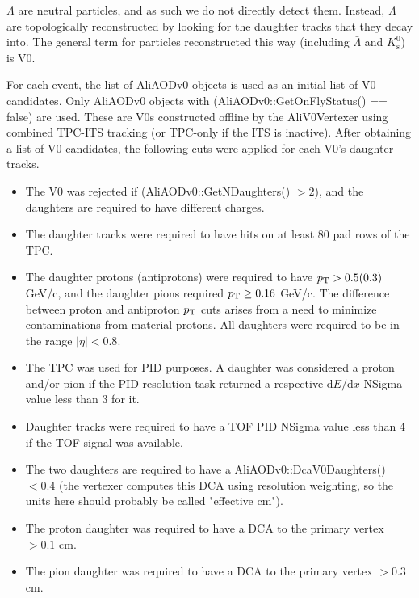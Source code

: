 $\Lambda$ are neutral particles, and as such we do not directly detect them.  Instead, $\Lambda$ are topologically reconstructed by looking for the daughter tracks that they decay into.  The general term for particles reconstructed this way (including $\bar{\Lambda}$ and $K^0_\mathrm{s}$) is V0.

For each event, the list of AliAODv0 objects is used as an initial list of V0 candidates.  Only AliAODv0 objects with (AliAODv0::GetOnFlyStatus() == false) are used.  These are V0s constructed offline by the AliV0Vertexer using combined TPC-ITS tracking (or TPC-only if the ITS is inactive).  After obtaining a list of V0 candidates, the following cuts were applied for each V0's daughter tracks.

\begin{itemize}
\item The V0 was rejected if (AliAODv0::GetNDaughters() $> 2$), and the daughters are required to have different charges.
\item The daughter tracks were required to have hits on at least 80 pad rows of the TPC.
\item The daughter protons (antiprotons) were required to have $p_{\rm T} > 0.5 (0.3)$ GeV/c, and the daughter pions required $p_{\rm T} \geq 0.16$ GeV/c. The difference between proton and antiproton $p_{\rm T}$ cuts arises from a need to minimize contaminations from material protons. All daughters were required to be in the range $|\eta| < 0.8$.
\item The TPC was used for PID purposes.  A daughter was considered a proton and/or pion if the PID resolution task returned a respective $\mathrm{d}E/\mathrm{d}x$ NSigma value less than 3 for it.
\item Daughter tracks were required to have a TOF PID NSigma value less than 4 if the TOF signal was available.
\item The two daughters are required to have a AliAODv0::DcaV0Daughters() $< 0.4$ (the vertexer computes this DCA using resolution weighting, so the units here should probably be called "effective cm").
\item The proton daughter was required to have a DCA to the primary vertex $> 0.1$ cm.
\item The pion daughter was required to have a DCA to the primary vertex $> 0.3$ cm.
\end{itemize}

